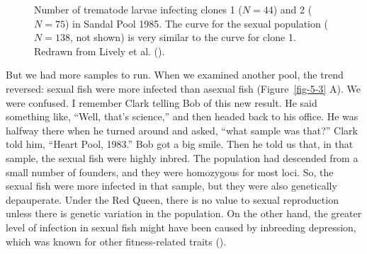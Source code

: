 \documentclass[
  letterpaper,
]{book}
\begin{document}
\begin{figure}


\caption[Number of trematode larvae infecting clones 1 and 2 in Sandal
Pool 1985]{\label{fig-5-2}Number of trematode larvae infecting clones 1
(\(N=44\)) and 2 (\(N=75\)) in Sandal Pool 1985. The curve for the
sexual population (\(N=138\), not shown) is very similar to the curve
for clone 1. Redrawn from Lively et al.
().}

\end{figure}%

But we had more samples to run. When we examined another pool, the trend
reversed: sexual fish were more infected than asexual fish
(Figure~\ref{fig-5-3} A). We were confused. I remember Clark telling Bob
of this new result. He said something like, ``Well, that's science,''
and then headed back to his office. He was halfway there when he turned
around and asked, ``what sample was that?'' Clark told him, ``Heart
Pool, 1983.'' Bob got a big smile. Then he told us that, in that sample,
the sexual fish were highly inbred. The population had descended from a
small number of founders, and they were homozygous for most loci. So,
the sexual fish were more infected in that sample, but they were also
genetically depauperate. Under the Red Queen, there is no value to
sexual reproduction unless there is genetic variation in the population.
On the other hand, the greater level of infection in sexual fish might
have been caused by inbreeding depression, which was known for other
fitness-related traits ().
\end{document}
